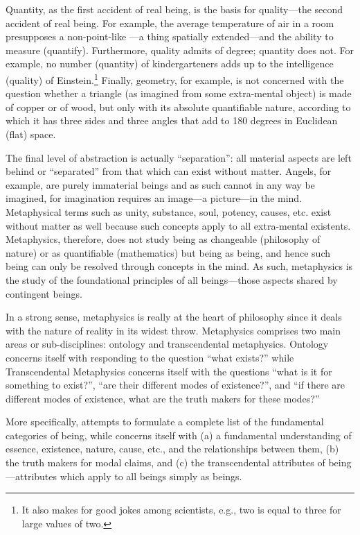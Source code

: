 Quantity, as the first accident of real being, is the basis for quality---the second accident of real being. For example, the average temperature of air in a room presupposes a non-point-like ---a thing spatially extended---and the ability to measure (quantify). Furthermore, quality admits of degree; quantity does not. For example, no number (quantity) of kindergarteners adds up to the intelligence (quality) of Einstein.\footnote{It also makes for good jokes among scientists, e.g., two is equal to three for large values of two.} Finally, geometry, for example, is not concerned with the question whether a triangle (as imagined from some extra-mental object) is made of copper or of wood, but only with its absolute quantifiable nature, according to which it has three sides and three angles that add to 180 degrees in Euclidean (flat) space.

The final level of abstraction is actually ``separation'': all material aspects are left behind or ``separated'' from that which can exist without matter. Angels, for example, are purely immaterial beings and as such cannot in any way be imagined, for imagination requires an image---a picture---in the mind. Metaphysical terms such as unity, substance, soul, potency, causes, etc. exist without matter as well because such concepts apply to all extra-mental existents. Metaphysics, therefore, does not study being as changeable (philosophy of nature) or as quantifiable (mathematics) but being as being, and hence such being can only be resolved through concepts in the mind. As such, metaphysics is the study of the foundational principles of all beings---those aspects shared by  contingent beings.

In a strong sense, metaphysics is really at the heart of philosophy since it deals with the nature of reality in its widest throw. Metaphysics comprises two main areas or sub-disciplines: ontology and transcendental metaphysics. Ontology concerns itself with responding to the question ``what exists?'' while Transcendental Metaphysics concerns itself with the questions ``what is it for something to exist?'', ``are their different modes of existence?'', and ``if there are different modes of existence, what are the truth makers for these modes?'' 

More specifically,  attempts to formulate a complete list of the fundamental categories of being, while  concerns itself with (a) a fundamental understanding of essence, existence, nature, cause, etc., and the relationships between them, (b) the truth makers for modal claims, and (c) the transcendental attributes of being---attributes which apply to all beings simply as beings.

